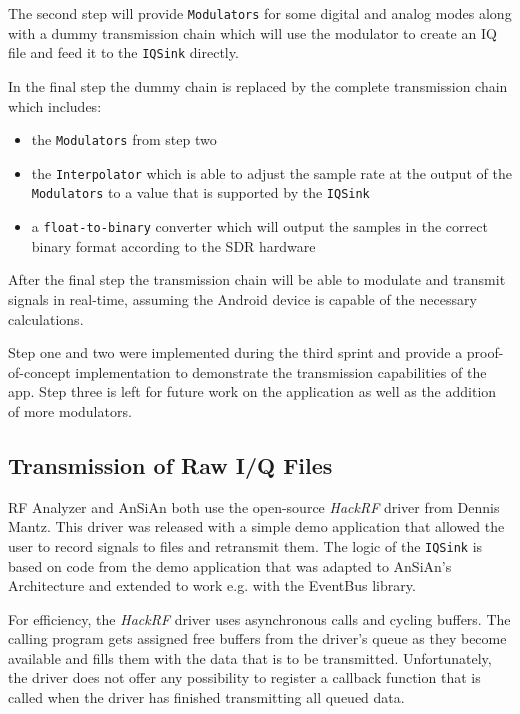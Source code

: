 The second step will provide \texttt{Modulators} for some digital and analog modes along
with a dummy transmission chain which will use the modulator to create an IQ
file and feed it to the \texttt{IQSink} directly.

In the final step the dummy chain is replaced by the complete transmission chain
which includes:
\begin{itemize}
	\item the \texttt{Modulators} from step two
	\item the \texttt{Interpolator} which is able to adjust the sample rate at the 
		output of the \texttt{Modulators} to a value that is supported by the \texttt{IQSink}
	\item a \texttt{float-to-binary} converter which will output the samples in the correct
		binary format according to the \ac{SDR} hardware
\end{itemize}

After the final step the transmission chain will be able to modulate and transmit
signals in real-time, assuming the Android device is capable of the necessary
calculations.

Step one and two were implemented during the third sprint and provide a proof-of-concept
implementation to demonstrate the transmission capabilities of the app.
Step three is left for future work on the application as well as the
addition of more modulators.


\subsection{Transmission of Raw I/Q Files}

RF Analyzer and \ac{AnSiAn} both use the open-source \emph{HackRF} driver from Dennis Mantz\cite{HackRF_Driver_GitHub}. This driver was released with a simple demo application that allowed the user to record signals to files and retransmit them. The logic of the \texttt{IQSink} is based on code from the demo application that was adapted to \ac{AnSiAn}'s Architecture and extended to work e.g. with the EventBus library.

For efficiency, the \emph{HackRF} driver uses asynchronous calls and cycling buffers. The calling program gets assigned free buffers from the driver's queue as they become available and fills them with the data that is to be transmitted. Unfortunately, the driver does not offer any possibility to register a callback function that is called when the driver has finished transmitting all queued data.

